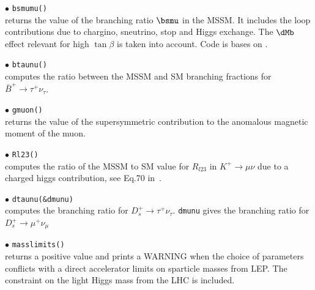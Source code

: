 \documentclass[12pt,a4paper]{article}
\begin{document}
\noi$\bullet$ \verb|bsmumu()|\\ returns the value of the branching ratio $\bsmu$ in the
MSSM. It includes the loop contributions
due to chargino, sneutrino, stop and Higgs exchange. The $\dMb$ 
effect relevant for high $\tan \beta$ is taken into account. Code is bases on \cite{Bobeth:2001sq}.

\noi$\bullet$ \verb|btaunu()|\\
computes the ratio between the MSSM and SM branching fractions for $\bar{B}^+\rightarrow\tau^+\nu_\tau$. 


\noi$\bullet$ \verb|gmuon()|\\
returns the value of the supersymmetric contribution to the
anomalous magnetic moment of the muon.

\noi$\bullet$ \verb|Rl23()|\\
computes the ratio of the MSSM to SM value for $R_{l23}$ in $K^+\rightarrow \mu\nu$  due to a  charged higgs contribution, see Eq.70 in~\cite{Belanger:2013oya}. 

\noi$\bullet$ \verb|dtaunu(&dmunu)|\\
computes the branching ratio  for ${D}_s^+\rightarrow\tau^+\nu_\tau$. \verb|dmunu| 
gives  the branching ratio  for ${D}_s^+\rightarrow\mu^+\nu_\mu$

 
\noi$\bullet$ \verb|masslimits()|\\
returns a positive value  and
 prints a WARNING when the choice of parameters conflicts with a
direct accelerator limits on sparticle masses from LEP.
The constraint on the light Higgs mass from the LHC is included.  

\end{document}
